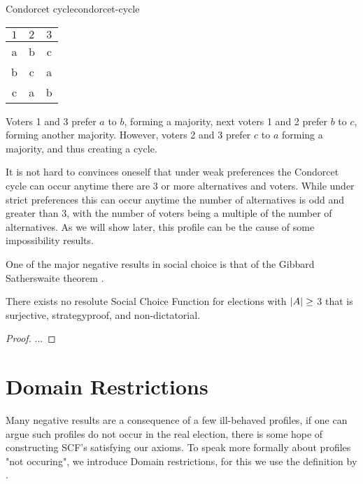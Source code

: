 \begin{example}{Condorcet cycle}{condorcet-cycle}
	\begin{minipage}{0.15\linewidth}
		\begin{tabular}{ccc}
			\toprule
			$1$ & $2$ & $3$ \\
			\midrule
			a   & b   & c   \\
			b   & c   & a   \\
			c   & a   & b   \\
			\bottomrule
		\end{tabular}
	\end{minipage}
	\hspace{0.02\linewidth}
	\begin{minipage}{0.78\linewidth}
		Voters 1 and 3  prefer $a$ to $b$, forming a majority, next voters 1 and 2 prefer $b$ to $c$, forming another majority. However, voters 2 and 3 prefer $c$ to $a$ forming a majority, and thus creating a cycle.
	\end{minipage}
\end{example}

It is not hard to convinces oneself that under weak preferences the Condorcet cycle can occur anytime there are 3 or more alternatives and voters. While under strict preferences this can occur anytime the number of alternatives is odd and greater than 3, with the number of voters being a multiple of the number of alternatives. As we will show later, this profile can be the cause of some impossibility results.

One of the major negative results in social choice is that of the Gibbard Satherswaite theorem \citep{gibbardManipulationVotingSchemes1973,satterthwaiteStrategyproofnessArrowsConditions1975}.

\begin{theorem}
	There exists no resolute Social Choice Function for elections with $|A| \geq$ 3 that is surjective, strategyproof, and non-dictatorial.
\end{theorem}

\begin{proof}
	...
\end{proof}

\section{Domain Restrictions}
\label{sec: Domain-res}
Many negative results are a consequence of a few ill-behaved profiles, if one can argue such profiles do not occur in the real election, there is some hope of constructing SCF's satisfying our axioms. To speak more formally about profiles "not occuring", we introduce Domain restrictions, for this we use the definition by \citet{elkindPreferenceRestrictionsComputational2022a}.

